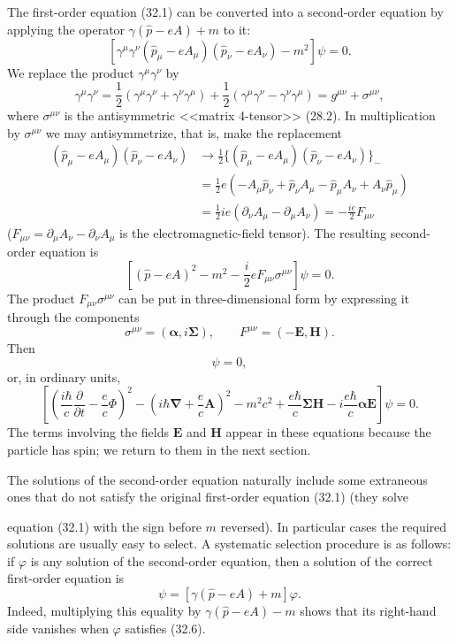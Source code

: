 The first-order equation (32.1) can be converted into a second-order equation by applying the operator $\gamma(\hat p-eA)+m$ to it:
\[
[\gamma^\mu\gamma^\nu(\hat p_\mu-eA_\mu)(\hat p_\nu-eA_\nu)-m^2]\psi=0.
\]
We replace the product $\gamma^\mu\gamma^\nu$ by
\[
\gamma^\mu\gamma^\nu
=\frac12(\gamma^\mu\gamma^\nu+\gamma^\nu\gamma^\mu)
+\frac12(\gamma^\mu\gamma^\nu-\gamma^\nu\gamma^\mu)
=g^{\mu\nu}+\sigma^{\mu\nu},
\]
where $\sigma^{\mu\nu}$ is the antisymmetric <<matrix 4-tensor>> (28.2). In multiplication by $\sigma^{\mu\nu}$ we may antisymmetrize, that is, make the replacement
\[
\begin{aligned}
(\hat p_\mu-eA_\mu)(\hat p_\nu-eA_\nu)
&\to\frac12\{(\hat p_\mu-eA_\mu)(\hat p_\nu-eA_\nu)\}_{-}\\
&=\frac12e(-A_\mu\hat p_\nu+\hat p_\nu A_\mu-\hat p_\mu A_\nu+A_\nu\hat p_\mu)\\
&=\frac12ie(\partial_\nu A_\mu-\partial_\mu A_\nu)
=-\frac{ie}{2}F_{\mu\nu}
\end{aligned}
\]
($F_{\mu\nu}=\partial_\mu A_\nu-\partial_\nu A_\mu$ is the electromagnetic-field tensor). The resulting second-order equation is
\begin{equation}
\left[(\hat p-eA)^2-m^2-\frac{i}{2}eF_{\mu\nu}\sigma^{\mu\nu}\right]\psi=0.
\tag{32.6}
\end{equation}
The product $F_{\mu\nu}\sigma^{\mu\nu}$ can be put in three-dimensional form by expressing it through the components
\[
\sigma^{\mu\nu}=(\boldsymbol\alpha,i\boldsymbol\Sigma),
\qquad
F^{\mu\nu}=(-\mathbf E,\mathbf H).
\]
Then
\begin{equation}
[(\hat p-eA)^2-m^2+e\boldsymbol\Sigma\mathbf H-ie\boldsymbol\alpha\mathbf E]\psi=0,
\tag{32.7}
\end{equation}
or, in ordinary units,
\begin{equation}
\left[
\left(\frac{i\hbar}{c}\frac{\partial}{\partial t}-\frac ec\Phi\right)^2
-\left(i\hbar\boldsymbol\nabla+\frac ec\mathbf A\right)^2
-m^2c^2
+\frac{e\hbar}{c}\boldsymbol\Sigma\mathbf H
-i\frac{e\hbar}{c}\boldsymbol\alpha\mathbf E
\right]\psi=0.
\tag{32.7a}
\end{equation}
The terms involving the fields $\mathbf E$ and $\mathbf H$ appear in these equations because the particle has spin; we return to them in the next section.

The solutions of the second-order equation naturally include some extraneous ones that do not satisfy the original first-order equation (32.1) (they solve

equation (32.1) with the sign before $m$ reversed). In particular cases the required solutions are usually easy to select. A systematic selection procedure is as follows: if $\varphi$ is any solution of the second-order equation, then a solution of the correct first-order equation is
\begin{equation}
\psi=[\gamma(\hat p-eA)+m]\varphi.
\tag{32.8}
\end{equation}
Indeed, multiplying this equality by $\gamma(\hat p-eA)-m$ shows that its right-hand side vanishes when $\varphi$ satisfies (32.6).


